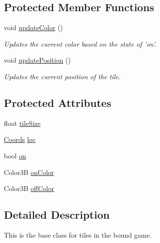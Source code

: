 \subsection*{\-Protected \-Member \-Functions}
\begin{DoxyCompactItemize}
\item 
void \hyperlink{class_b_tile_af9d81dcd02de972c1d451af63c0a48e5}{update\-Color} ()
\begin{DoxyCompactList}\small\item\em \-Updates the current color based on the state of 'on'. \end{DoxyCompactList}\item 
void \hyperlink{class_b_tile_ae6faeef28449999ac4f1b2938fd2e89c}{update\-Position} ()
\begin{DoxyCompactList}\small\item\em \-Updates the current position of the tile. \end{DoxyCompactList}\end{DoxyCompactItemize}
\subsection*{\-Protected \-Attributes}
\begin{DoxyCompactItemize}
\item 
float \hyperlink{class_b_tile_a0c85a54373837c9bbe0fa2f83475234b}{tile\-Size}
\item 
\hyperlink{struct_coords}{\-Coords} \hyperlink{class_b_tile_a9a106634c3890eaa7a69cddc9680d822}{loc}
\item 
bool \hyperlink{class_b_tile_a793fe978c4d34fc611dbe7d21079610d}{on}
\item 
\-Color3\-B \hyperlink{class_b_tile_adf1af86d1ae9fdc122007381d4bf0a94}{on\-Color}
\item 
\-Color3\-B \hyperlink{class_b_tile_a06ca0d5b7b5c17a3d8c53395c2614a87}{off\-Color}
\end{DoxyCompactItemize}


\subsection{\-Detailed \-Description}
\-This is the base class for tiles in the bound game. 

